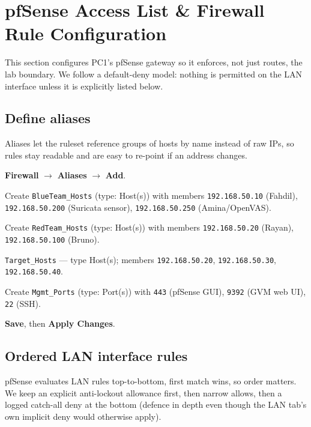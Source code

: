 \documentclass[11pt,a4paper]{article}
\begin{document}
\clearpage

\section{pfSense Access List \& Firewall Rule Configuration}
\label{sec:acl}

This section configures PC1's pfSense gateway so it enforces, not just routes, the lab
boundary. We follow a default-deny model: nothing is permitted on the LAN interface
unless it is explicitly listed below.

\subsection{Define aliases}
Aliases let the ruleset reference groups of hosts by name instead of raw IPs, so rules
stay readable and are easy to re-point if an address changes.

\begin{steps}
\item \textbf{Firewall} $\to$ \textbf{Aliases} $\to$ \textbf{Add}.
\item Create \texttt{BlueTeam\_Hosts} (type: Host(s)) with members
  \texttt{192.168.50.10} (Fahdil), \texttt{192.168.50.200} (Suricata sensor),
  \texttt{192.168.50.250} (Amina/OpenVAS).
\item Create \texttt{RedTeam\_Hosts} (type: Host(s)) with members
  \texttt{192.168.50.20} (Rayan), \texttt{192.168.50.100} (Bruno).
\item \texttt{Target\_Hosts} --- type Host(s); members
  \texttt{192.168.50.20}, \texttt{192.168.50.30}, \texttt{192.168.50.40}.
\item Create \texttt{Mgmt\_Ports} (type: Port(s)) with \texttt{443} (pfSense GUI),
  \texttt{9392} (GVM web UI), \texttt{22} (SSH).
\item \textbf{Save}, then \textbf{Apply Changes}.
\end{steps}

\subsection{Ordered LAN interface rules}
pfSense evaluates LAN rules top-to-bottom, first match wins, so order matters. We keep
an explicit anti-lockout allowance first, then narrow allows, then a logged catch-all
deny at the bottom (defence in depth even though the LAN tab's own implicit deny would
otherwise apply).
\end{document}
